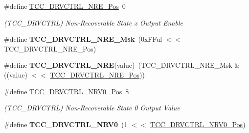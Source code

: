 \begin{DoxyCompactItemize}
\item 
\hypertarget{group___s_a_m_l21___t_c_c_gaa831f749ffa61dd819ff3eb3de23db0e}{}\#define \hyperlink{group___s_a_m_l21___t_c_c_gaa831f749ffa61dd819ff3eb3de23db0e}{T\+C\+C\+\_\+\+D\+R\+V\+C\+T\+R\+L\+\_\+\+N\+R\+E\+\_\+\+Pos}~0\label{group___s_a_m_l21___t_c_c_gaa831f749ffa61dd819ff3eb3de23db0e}

\begin{DoxyCompactList}\small\item\em (T\+C\+C\+\_\+\+D\+R\+V\+C\+T\+R\+L) Non-\/\+Recoverable State x Output Enable \end{DoxyCompactList}\item 
\hypertarget{group___s_a_m_l21___t_c_c_ga9899ca1e063aaeb457313f111f303161}{}\#define {\bfseries T\+C\+C\+\_\+\+D\+R\+V\+C\+T\+R\+L\+\_\+\+N\+R\+E\+\_\+\+Msk}~(0x\+F\+Ful $<$$<$ T\+C\+C\+\_\+\+D\+R\+V\+C\+T\+R\+L\+\_\+\+N\+R\+E\+\_\+\+Pos)\label{group___s_a_m_l21___t_c_c_ga9899ca1e063aaeb457313f111f303161}

\item 
\hypertarget{group___s_a_m_l21___t_c_c_gaf7dbaede742fdfffc08779da52b1dc4f}{}\#define {\bfseries T\+C\+C\+\_\+\+D\+R\+V\+C\+T\+R\+L\+\_\+\+N\+R\+E}(value)~(T\+C\+C\+\_\+\+D\+R\+V\+C\+T\+R\+L\+\_\+\+N\+R\+E\+\_\+\+Msk \& ((value) $<$$<$ \hyperlink{group___s_a_m_l21___t_c_c_gaa831f749ffa61dd819ff3eb3de23db0e}{T\+C\+C\+\_\+\+D\+R\+V\+C\+T\+R\+L\+\_\+\+N\+R\+E\+\_\+\+Pos}))\label{group___s_a_m_l21___t_c_c_gaf7dbaede742fdfffc08779da52b1dc4f}

\item 
\hypertarget{group___s_a_m_l21___t_c_c_ga2ca8f1cf7b615a87d9497d236543e701}{}\#define \hyperlink{group___s_a_m_l21___t_c_c_ga2ca8f1cf7b615a87d9497d236543e701}{T\+C\+C\+\_\+\+D\+R\+V\+C\+T\+R\+L\+\_\+\+N\+R\+V0\+\_\+\+Pos}~8\label{group___s_a_m_l21___t_c_c_ga2ca8f1cf7b615a87d9497d236543e701}

\begin{DoxyCompactList}\small\item\em (T\+C\+C\+\_\+\+D\+R\+V\+C\+T\+R\+L) Non-\/\+Recoverable State 0 Output Value \end{DoxyCompactList}\item 
\hypertarget{group___s_a_m_l21___t_c_c_gace85df0619fa1dc2ba49a21b1b01d164}{}\#define {\bfseries T\+C\+C\+\_\+\+D\+R\+V\+C\+T\+R\+L\+\_\+\+N\+R\+V0}~(1 $<$$<$ \hyperlink{group___s_a_m_l21___t_c_c_ga2ca8f1cf7b615a87d9497d236543e701}{T\+C\+C\+\_\+\+D\+R\+V\+C\+T\+R\+L\+\_\+\+N\+R\+V0\+\_\+\+Pos})\label{group___s_a_m_l21___t_c_c_gace85df0619fa1dc2ba49a21b1b01d164}


\end{DoxyCompactItemize}
